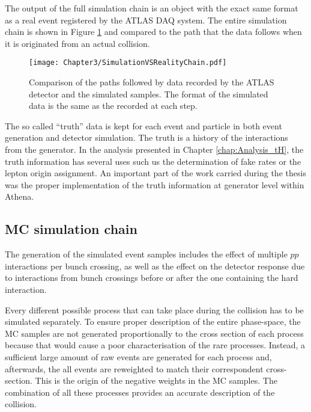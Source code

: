 The output of the full simulation chain is an object with the exact same format as a real event registered by 
 the ATLAS DAQ system. The entire simulation chain is shown 
 in Figure \ref{fig:Chap3:SimVsReal} and compared to the path that the data follows when it is originated from an actual collision. 
 
 \begin{figure}
    \centering
    \texttt{[image: Chapter3/SimulationVSRealityChain.pdf]}
    \caption{Comparison of the paths followed by data recorded by the ATLAS detector and the simulated samples.
    The format of the simulated data is the same as the recorded at each step. }
    \label{fig:Chap3:SimVsReal}
\end{figure}
 
The so called ``truth'' data is kept for each event and particle in both event generation and detector simulation. 
The truth is a history of the interactions from the generator. In the analysis presented in Chapter 
\ref{chap:Analysis_tH}, the truth information has several uses such us the determination of fake rates or the lepton 
origin assignment. An important part of the work carried during the thesis was the proper implementation of the truth 
information at generator level within Athena.





\subsection{MC simulation chain}
\label{sec:Chap3.1:MC:Steps}
The generation of the simulated event samples includes the effect of multiple \(pp\) interactions per 
bunch crossing, as well as the effect on the detector response due to interactions from bunch crossings 
before or after the one containing the hard interaction. 

Every different possible process that can take place
during the collision has to be simulated separately. To ensure proper description 
of the entire phase-space, the MC samples are not generated proportionally 
to the cross section of each process because that would cause a poor
characterisation of the rare processes. Instead, a sufficient large amount of raw
events are generated for each process and, afterwards, the all events
are reweighted to match their correspondent cross-section. This is the
origin of the negative weights in the MC samples. The combination of all these 
processes provides an accurate description of the collision. 

